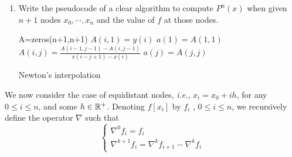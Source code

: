 \begin{enumerate}
	\begin{proof}
	We prove by induction.
	For \(n=1\), we have proved in the previous step that 
	\[ f[x_0,x_1]=\frac{f(x_1)-f(x_0)}{x_1-x_0} \]
	Suppose this is true for \(k=n\), then according to the previous result, we have the interpolating polynomial with degree at most $n$ passing \((x_0,f(x_0)),(x_1,f(x_1)),\cdots,\\ (x_{n},f(x_{n}))\)
	\[ P_1^n(x)=f(x_0)+\sum_{j=1}^{n} f[x_0,\cdots, x_j] \prod_{k=0}^{j-1}(x-x_k) \]
	When \(k=n+1\), we also have another polynomial of degree at most $n$ interpolating \((x_1,f(x_1)),(x_2,f(x_2)), \cdots, (x_{n+1},f(x_{n+1}))\)
	\[ P_2^n(x)=f(x_1)+\sum_{j=2}^{n+1} f[x_1,\cdots, x_j] \prod_{k=1}^{j}(x-x_k) \]
	We can express \(P^{n+1}(x)\) by these two interpolating polynomials
	\[ P^{n+1}(x)=\frac{x-x_0}{x_{n+1}-x_0}P_2^n(x)+\frac{x_{n+1}-x}{x_{n+1}-x_0}P_1^n(x) \]
	This is constructed to satisfy
	\[ P^{n+1}(x_i)=\begin{cases}P_1^n(x_0)=f(x_0) & i=0 \\ f(x_i) & i=1,\cdots,n \\ P_2^n(x)=f(x_{n+1}) & i=n+1 \end{cases} \]
	So this is indeed the interpolating polynomial of these $n+2$ points.
	And the coefficient of \(x^{n+1}\) is
	\[ \frac{f[x_1,\cdots, x_{n+1}]-f[x_0,\cdots, x_n]}{x_{n+1}-x_0} \]
	By the principle of mathematical induction, we have it true for all \(k\in\N^*\).
	\end{proof}
	\item Write the pseudocode of a clear algorithm to compute \(P^n(x)\) when given $n+1$ nodes \(x_0,\cdots,x_n\) and the value of $f$ at those nodes.
	\begin{algorithm}[h]
	A=zeros(n+1,n+1)\;
	{
		\(A(i,1)=y(i)\)\;
	}
	\(a(1)=A(1,1)\)\;
	{
		{
			\(A(i,j)=\frac{A(i-1,j-1)-A(i,j-1)}{x(i-j+1)-x(i)}\)\;
		}
		\(a(j)=A(j,j)\)\;
	}
	\caption{Newton's interpolation}
	\end{algorithm}
\end{enumerate}

We now consider the case of equidistant nodes, \textit{i.e.}, \(x_i = x_0 + ih\), for any \(0\leq i\leq n\), and some \(h\in\mathbb{R}^+\).
Denoting \(f[x_i]\) by $f_i$ , \(0\leq i\leq n\), we recursively define the operator $\nabla$ such that
\[ \begin{cases} \nabla^0 f_i=f_i \\ \nabla^{k+1}f_i=\nabla^{k}f_{i+1}-\nabla^{k}f_{i} \end{cases} \]

